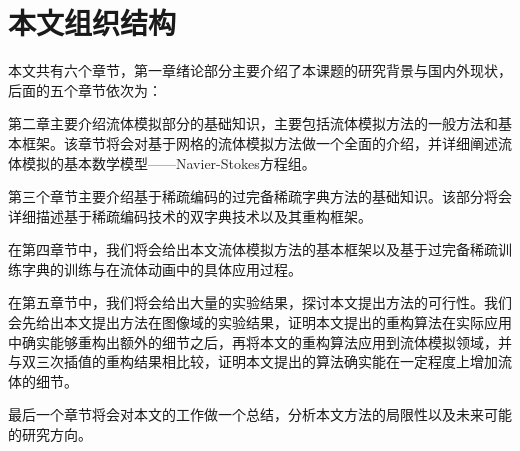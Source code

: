 \section{本文组织结构}
\label{sec:orgnization}

本文共有六个章节，第一章绪论部分主要介绍了本课题的研究背景与国内外现状，后面的五个章节依次为：

第二章主要介绍流体模拟部分的基础知识，主要包括流体模拟方法的一般方法和基本框架。该章节将会对基于网格的流体模拟方法做一个全面的介绍，并详细阐述流体模拟的基本数学模型——Navier-Stokes方程组。

第三个章节主要介绍基于稀疏编码的过完备稀疏字典方法的基础知识。该部分将会详细描述基于稀疏编码技术的双字典技术以及其重构框架。

在第四章节中，我们将会给出本文流体模拟方法的基本框架以及基于过完备稀疏训练字典的训练与在流体动画中的具体应用过程。

在第五章节中，我们将会给出大量的实验结果，探讨本文提出方法的可行性。我们会先给出本文提出方法在图像域的实验结果，证明本文提出的重构算法在实际应用中确实能够重构出额外的细节之后，再将本文的重构算法应用到流体模拟领域，并与双三次插值的重构结果相比较，证明本文提出的算法确实能在一定程度上增加流体的细节。

最后一个章节将会对本文的工作做一个总结，分析本文方法的局限性以及未来可能的研究方向。

